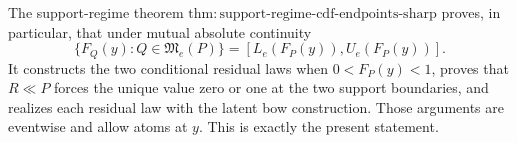 The support-regime theorem \(\mathrm{thm:support\text{-}regime\text{-}cdf\text{-}endpoints\text{-}sharp}\) proves, in particular, that under mutual absolute continuity
\[
 \{F_Q(y):Q\in\mathfrak M_e(P)\}=[L_e(F_P(y)),U_e(F_P(y))].
\]
It constructs the two conditional residual laws when \(0<F_P(y)<1\), proves that \(R\ll P\) forces the unique value zero or one at the two support boundaries, and realizes each residual law with the latent bow construction.  Those arguments are eventwise and allow atoms at \(y\).  This is exactly the present statement.